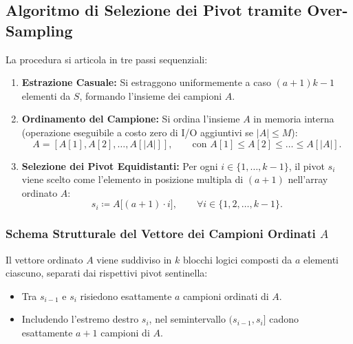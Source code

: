 \subsection{Algoritmo di Selezione dei Pivot tramite Over-Sampling}
La procedura si articola in tre passi sequenziali:
\begin{enumerate}
  \item \textbf{Estrazione Casuale:} Si estraggono uniformemente a caso $(a + 1)k - 1$ elementi da $S$, formando l'insieme dei campioni $A$.
  \item \textbf{Ordinamento del Campione:} Si ordina l'insieme $A$ in memoria interna (operazione eseguibile a costo zero di I/O aggiuntivi se $|A| \le M$):
  \begin{equation}
    A = [A[1], A[2], \dots, A[|A|]], \qquad \text{con } A[1] \le A[2] \le \dots \le A[|A|].
  \end{equation}
  \item \textbf{Selezione dei Pivot Equidistanti:} Per ogni $i \in \{1, \dots, k - 1\}$, il pivot $s_i$ viene scelto come l'elemento in posizione multipla di $(a + 1)$ nell'array ordinato $A$:
  \begin{equation}
    s_i \coloneqq A\big[(a + 1) \cdot i\big], \qquad \forall i \in \{1, 2, \dots, k - 1\}.
    \label{eq:pivot-selection-rule}
  \end{equation}
\end{enumerate}

\subsubsection{Schema Strutturale del Vettore dei Campioni Ordinati \texorpdfstring{$A$}{A}}
Il vettore ordinato $A$ viene suddiviso in $k$ blocchi logici composti da $a$ elementi ciascuno, separati dai rispettivi pivot sentinella:
\begin{itemize}
  \item Tra $s_{i-1}$ e $s_i$ risiedono esattamente $a$ campioni ordinati di $A$.
  \item Includendo l'estremo destro $s_i$, nel semintervallo $(s_{i-1}, s_i]$ cadono esattamente $a + 1$ campioni di $A$.
\end{itemize}

